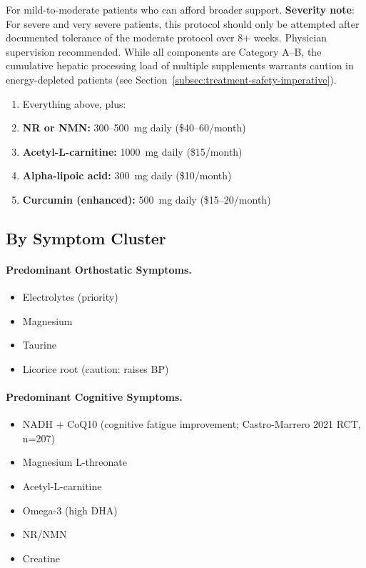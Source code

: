 For mild-to-moderate patients who can afford broader support. \textbf{Severity note}: For severe and very severe patients, this protocol should only be attempted after documented tolerance of the moderate protocol over 8+ weeks. Physician supervision recommended. While all components are Category A--B, the cumulative hepatic processing load of multiple supplements warrants caution in energy-depleted patients (see Section~\ref{subsec:treatment-safety-imperative}).

\begin{enumerate}
    \item Everything above, plus:
    \item \textbf{NR or NMN:} 300--500~mg daily (\$40--60/month)
    \item \textbf{Acetyl-L-carnitine:} 1000~mg daily (\$15/month)
    \item \textbf{Alpha-lipoic acid:} 300~mg daily (\$10/month)
    \item \textbf{Curcumin (enhanced):} 500~mg daily (\$15--20/month)
\end{enumerate}

\subsection{By Symptom Cluster}

\paragraph{Predominant Orthostatic Symptoms.}
\begin{itemize}
    \item Electrolytes (priority)
    \item Magnesium
    \item Taurine
    \item Licorice root (caution: raises BP)
\end{itemize}

\paragraph{Predominant Cognitive Symptoms.}
\begin{itemize}
    \item NADH + CoQ10 (cognitive fatigue improvement; Castro-Marrero 2021 RCT, n=207)
    \item Magnesium L-threonate
    \item Acetyl-L-carnitine
    \item Omega-3 (high DHA)
    \item NR/NMN
    \item Creatine
\end{itemize}

